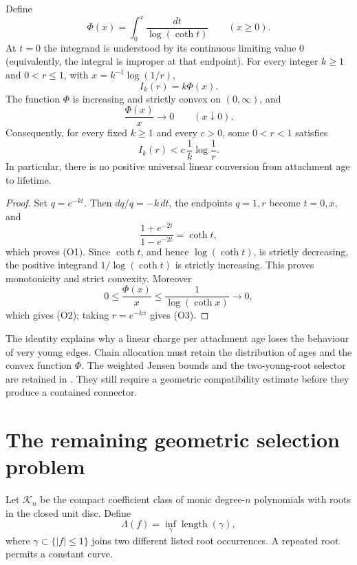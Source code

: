\documentclass[11pt]{article}
\begin{document}
\begin{theorem}
\label{res:orlicz-currency}
Define
\[
 \Phi(x)=\int_0^x\frac{dt}{\log(\coth t)}\qquad(x\ge0).
\]
At $t=0$ the integrand is understood by its continuous limiting value $0$
(equivalently, the integral is improper at that endpoint).
For every integer $k\ge1$ and $0<r\le1$, with
$x=k^{-1}\log(1/r)$,
\[
 I_k(r)=k\Phi(x).                                      \tag{O1}
\]
The function $\Phi$ is increasing and strictly convex on $(0,\infty)$, and
\[
 \frac{\Phi(x)}x\longrightarrow0\qquad(x\downarrow0). \tag{O2}
\]
Consequently, for every fixed $k\ge1$ and every $c>0$, some $0<r<1$
satisfies
\[
 I_k(r)<c\,\frac1k\log\frac1r.                        \tag{O3}
\]
In particular, there is no positive universal linear conversion from
attachment age to lifetime.
\end{theorem}

\begin{proof}
Set $q=e^{-kt}$.  Then $dq/q=-k\,dt$, the endpoints $q=1,r$ become
$t=0,x$, and
\[
 \frac{1+e^{-2t}}{1-e^{-2t}}=\coth t,
\]
which proves (O1).  Since $\coth t$, and hence $\log(\coth t)$, is strictly
decreasing, the positive integrand $1/\log(\coth t)$ is strictly increasing.
This proves monotonicity and strict convexity.  Moreover
\[
 0\le\frac{\Phi(x)}x\le\frac1{\log(\coth x)}\longrightarrow0,
\]
which gives (O2); taking $r=e^{-kx}$ gives (O3).
\end{proof}


The identity explains why a linear charge per attachment age loses the
behaviour of very young edges.  Chain allocation must retain the distribution
of ages and the convex function $\Phi$.  The weighted Jensen bounds and the
two-young-root selector are retained in
.
They still require a geometric compatibility estimate before they produce a
contained connector.

\section{The remaining geometric selection problem}\label{sec:open}

Let $\mathcal K_n$ be the compact coefficient class of monic degree-$n$
polynomials with roots in the closed unit disc.  Define
\[
 \Lambda(f)=\inf_\gamma\operatorname{length}(\gamma),
\]
where $\gamma\subset\{|f|\le1\}$ joins two different listed root
occurrences.  A repeated root permits a constant curve.
\end{document}
